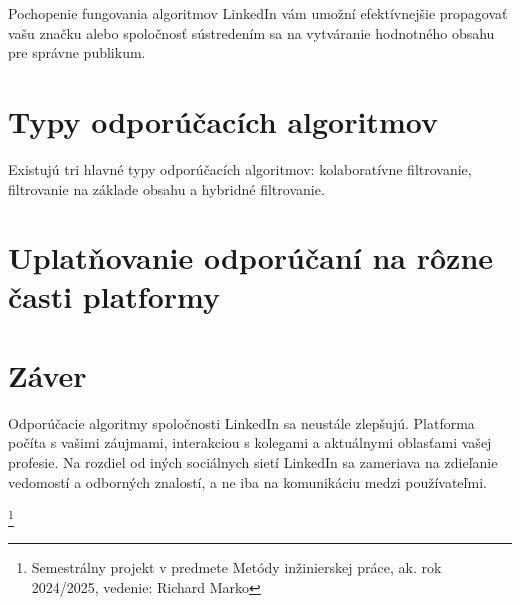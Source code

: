 \documentclass[twoside,slovak,a4paper]{coursepaper}
\begin{document}
Pochopenie fungovania algoritmov LinkedIn vám umožní efektívnejšie propagovať vašu značku alebo spoločnosť sústredením sa na vytváranie hodnotného obsahu pre správne publikum.


\section{Typy odporúčacích algoritmov} \label{Typy}
Existujú tri hlavné typy odporúčacích algoritmov: kolaboratívne filtrovanie, filtrovanie na základe obsahu a hybridné filtrovanie. 



\section{Uplatňovanie odporúčaní na rôzne časti platformy} \label{Uplatňovanie}


 

\section{Záver} \label{zaver}
Odporúčacie algoritmy spoločnosti LinkedIn sa neustále zlepšujú. Platforma počíta s vašimi záujmami, interakciou s kolegami a aktuálnymi oblasťami vašej profesie. Na rozdiel od iných sociálnych sietí LinkedIn sa zameriava na zdieľanie vedomostí a odborných znalostí, a ne iba na komunikáciu medzi používateľmi.

\thanks{Semestrálny projekt v predmete Metódy inžinierskej práce, ak. rok 2024/2025, vedenie: Richard Marko}


 
\end{document}
